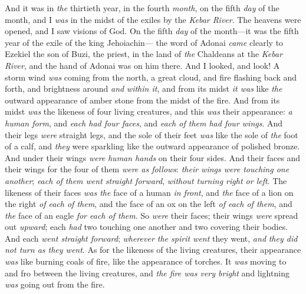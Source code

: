 
\begin{biblechapter} %
 And it was in \textit{the} thirtieth year, in the fourth \textit{month}, on the fifth \textit{day} of the month, and I \textit{was} in the midst of the exiles by the \textit{Kebar River}. The heavens were opened, and I saw visions of God.
\verse On the fifth \textit{day} of the month—it was the fifth year of the exile of the king Jehoiachin—
\verse the word of Adonai \textit{came} clearly to Ezekiel the son of Buzi, the priest, in the land of \textit{the} Chaldeans at the \textit{Kebar River}, and the hand of Adonai was on him there.
\verse And I looked, and look! A storm wind \textit{was} coming from the north, a great cloud, and fire flashing back and forth, and brightness around \textit{and} \textit{within it}, and from its midst \textit{it was} like \textit{the} outward appearance of amber stone from the midst of the fire.
\verse And from its midst \textit{was} the likeness of four living creatures, and this \textit{was} their appearance: \textit{a human form},
\verse and \textit{each had four faces}, and \textit{each of them had four wings}.
\verse And their legs \textit{were} straight legs, and the sole of their feet \textit{was} like the sole of \textit{the} foot of a calf, and \textit{they} were sparkling like the outward appearance of polished bronze.
\verse And under their wings \textit{were} \textit{human hands} on their four sides. And their faces and their wings for the four of them \textit{were as follows}:
\verse \textit{their wings were touching one another}; \textit{each of them went straight forward}, \textit{without turning right or left}.
\verse The likeness of their faces \textit{was the} face of a human \textit{in front}, and \textit{the} face of a lion on the right \textit{of each of them}, and the face of an ox on the left \textit{of each of them}, and \textit{the} face of an eagle \textit{for each of them}.
\verse So \textit{were} their faces; their wings \textit{were} spread out \textit{upward}; each \textit{had} two touching one another and two covering their bodies.
\verse And each \textit{went straight forward}; \textit{wherever the spirit went} they went, \textit{and} \textit{they did not turn as they went}.
\verse As for the likeness of the living creatures, their appearance \textit{was} like burning coals of fire, like the appearance of torches. It \textit{was} moving to and fro between the living creatures, and \textit{the fire was very bright} and lightning \textit{was} going out from the fire.

\end{biblechapter}
